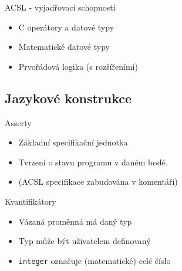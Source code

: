 \documentclass[11pt]{beamer}
\begin{document}
\begin{frame}{ACSL - vyjadřovací schopnosti}
\begin{itemize}
	\item C operátory a datové typy
	\item Matematické datové typy
	\item Prvořádová logika (s rozšířeními)
\end{itemize}
\end{frame}


\subsection{Jazykové konstrukce}


\begin{frame}{Asserty}
\lstBasicAssert
\begin{itemize}
	\item Základní specifikační jednotka
	\item Tvrzení o stavu programu v daném bodě.
	\item (ACSL specifikace zabudována v komentáři)
\end{itemize}
\end{frame}



\begin{frame}{Kvantifikátory}
\lstQuantifiedAssert
\begin{itemize}
	\item Vázaná proměnná má daný typ
	\item Typ může být uživatelem definovaný
	\item \texttt{integer} označuje (matematické) celé číslo
\end{itemize}
\end{frame}


\end{document}

